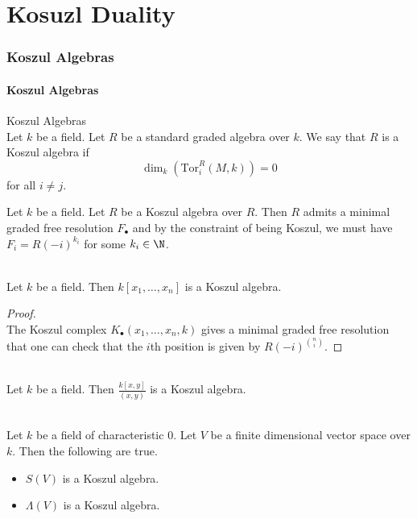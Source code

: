 \documentclass[a4paper]{article}
\begin{document}
\pagebreak

\part{Kosuzl Duality}

\pagebreak
\section{Koszul Algebras}
\subsection{Koszul Algebras}
\begin{defn}{Koszul Algebras}{}\\
Let $k$ be a field. Let $R$ be a standard graded algebra over $k$. We say that $R$ is a Koszul algebra if $$\dim_k(\text{Tor}_i^R(M,k))=0$$ for all $i\neq j$. 
\end{defn}

Let $k$ be a field. Let $R$ be a Koszul algebra over $R$. Then $R$ admits a minimal graded free resolution $F_\bullet$ and by the constraint of being Koszul, we must have $F_i=R(-i)^{k_i}$ for some $k_i\in\N$. 

\begin{eg}{}{}\\
Let $k$ be a field. Then $k[x_1,\dots,x_n]$ is a Koszul algebra. 
\begin{proof}\\
The Koszul complex $K_\bullet(x_1,\dots,x_n,k)$ gives a minimal graded free resolution that one can check that the $i$th position is given by $R(-i)^{\binom{n}{i}}$. 
\end{proof}
\end{eg}

\begin{eg}{}{}\\
Let $k$ be a field. Then $\frac{k[x,y]}{(x,y)}$ is a Koszul algebra. 
\end{eg}

\begin{prp}{}{}\\
Let $k$ be a field of characteristic $0$. Let $V$ be a finite dimensional vector space over $k$. Then the following are true. 
\begin{itemize}
\item $S(V)$ is a Koszul algebra. 
\item $\Lambda(V)$ is a Koszul algebra. 
\end{itemize}
\end{prp}
\end{document}
